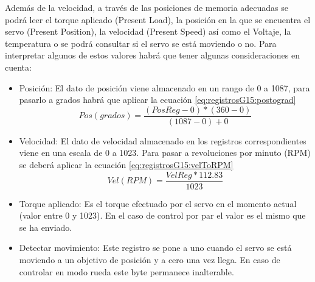 	
		Además de la velocidad, a través de las posiciones de memoria adecuadas se podrá leer el torque aplicado (Present Load), la posición en la que se encuentra el servo (Present Position), la velocidad (Present Speed) así como el Voltaje, la temperatura o se podrá consultar si el servo se está moviendo o no. Para interpretar algunos de estos valores habrá que tener algunas consideraciones en cuenta:
		\begin{itemize}
			\item Posición: El dato de posición viene almacenado en un rango de 0 a 1087, para pasarlo a grados habrá que aplicar la ecuación \ref{eq:registrosG15:postograd}
			\begin{equation}
			\label{eq:registrosG15:postograd}
			Pos(grados) = \dfrac{(PosReg - 0) * (360 - 0)}{(1087-0)+0}
			\end{equation}
			\item Velocidad: El dato de velocidad almacenado en los registros correspondientes viene en una escala de 0 a 1023. Para pasar a revoluciones por minuto (RPM) se deberá aplicar la ecuación \ref{eq:registrosG15:velToRPM}
			\begin{equation}
			\label{eq:registrosG15:velToRPM}
			Vel(RPM) = \dfrac{VelReg * 112.83}{1023}
			\end{equation}
			\item Torque aplicado: Es el torque efectuado por el servo en el momento actual (valor entre 0 y 1023). En el caso de control por par el valor es el mismo que se ha enviado.
			\item Detectar movimiento: Este registro se pone a uno cuando el servo se está moviendo a un objetivo de posición y a cero una vez llega. En caso de controlar en modo rueda este byte permanece inalterable.
		\end{itemize}
